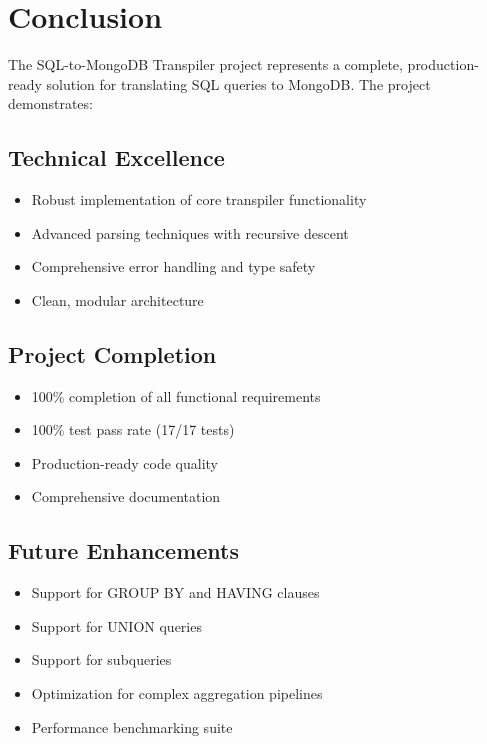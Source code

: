 \documentclass[12pt,a4paper]{article}
\begin{document}
\newpage

\section{Conclusion}

The SQL-to-MongoDB Transpiler project represents a complete, production-ready solution for translating SQL queries to MongoDB. The project demonstrates:

\subsection{Technical Excellence}
\begin{itemize}
    \item Robust implementation of core transpiler functionality
    \item Advanced parsing techniques with recursive descent
    \item Comprehensive error handling and type safety
    \item Clean, modular architecture
\end{itemize}

\subsection{Project Completion}
\begin{itemize}
    \item 100\% completion of all functional requirements
    \item 100\% test pass rate (17/17 tests)
    \item Production-ready code quality
    \item Comprehensive documentation
\end{itemize}

\subsection{Future Enhancements}
\begin{itemize}
    \item Support for GROUP BY and HAVING clauses
    \item Support for UNION queries
    \item Support for subqueries
    \item Optimization for complex aggregation pipelines
    \item Performance benchmarking suite
\end{itemize}
\end{document}
